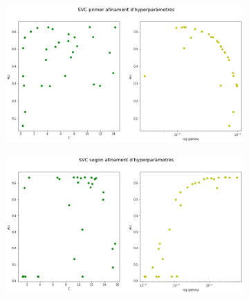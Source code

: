 \documentclass[12pt, spanish]{article}
\begin{document}

\begin{figure}
  \begin{subfigure}[t]{.47\textwidth}
    \centering
    \includegraphics[width=\linewidth]{images/hyper_svm1.png}
  \end{subfigure}
  \hfill
  \begin{subfigure}[t]{.47\textwidth}
    \centering
    \includegraphics[width=\linewidth]{images/hyper_svm2.png}
  \end{subfigure}

  \medskip


\end{figure}
\end{document}
